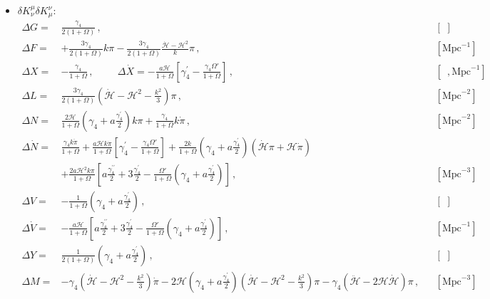\documentclass[prd,nofootinbib,showpacs]{revtex4}
\def\l{\left}
\def\r{\right}
\def\f{\frac}
\def\hub{{\mathcal H}}
\begin{document}
{\begin{itemize}
{\begin{align}
%
& \Delta{ Y}= \f{3}{2(1+\Omega)}\l( \gamma_3+a\f{\gamma_3^\prime}{2}\r) \, , & &  [\,\,] \,\nonumber\\
%
&\Delta{ U}=\f{3}{2}\f{\gamma_3}{1+\Omega} \, . & &  [\,\,] \,
\end{align}}
%
\item[] \underline{$\delta K^\mu_\nu\delta K^\nu_\mu$}:\\
{\small
\begin{align} \label{Eq:ContribGamma4}
%
\Delta{ G} =& \f{\gamma_4}{2(1+\Omega)} \, , & &  [\,\,]  \, \nonumber \\
%
\Delta{ F} =& +\f{3\gamma_4}{2(1+\Omega)}k\pi-\f{3\gamma_4 }{2(1+\Omega)}\f{\dot{\hub}-\hub^2}{k}\pi \, ,& &  [\text{Mpc}^{-1}] \,\nonumber\\
%
\Delta{ X} =& -\f{\gamma_4}{1+\Omega} \,,\hspace{1cm} \Delta\dot{X}=-\f{a\hub}{1+\Omega}\l[\gamma_4^\prime-\f{\gamma_4\Omega'}{1+\Omega} \r] \, , & &  [\,\,\,, \text{Mpc}^{-1}]  \, \nonumber \\
%
\Delta{ L} =& \f{3\gamma_4}{2(1+\Omega)}\l(\dot{\hub}-\hub^2-\f{k^2}{3}\r)\pi \, , & &  [\text{Mpc}^{-2}] \,\nonumber\\
%
\Delta{ N} =& \f{2 \hub}{1+\Omega}\l(\gamma_4+a\f{\gamma_4^\prime}{2} \r)k\pi + \f{\gamma_4}{1+\Omega}k\dot{\pi}\, , & &  [\text{Mpc}^{-2}] \,\nonumber\\
%
\Delta\dot{N} =& \f{\gamma_4k\ddot{\pi}}{1+\Omega} +\f{a\hub k\dot{\pi}}{1+\Omega}\l[\gamma_4^\prime-\f{\gamma_4\Omega'}{1+\Omega} \r] +\f{2k}{1+\Omega}\l(\gamma_4+a\f{\gamma_4^\prime}{2} \r)\l( \dot{\hub}\pi + \hub \dot{\pi} \r) \nonumber\\
& +\f{2a\hub^2k\pi}{1+\Omega}\l[a \f{\gamma_4^{\prime\prime}}{2}+3\f{\gamma_4^\prime}{2}-\f{\Omega'}{1+\Omega}\l(\gamma_4+a\f{\gamma_4^\prime}{2} \r) \r] \, ,& &  [\text{Mpc}^{-3}]  \, \nonumber \\
%
\Delta{ V} =& -\f{1}{1+\Omega}\l(\gamma_4+a\f{\gamma_4^\prime}{2} \r) \, ,& &  [\,\,]  \, \nonumber \\
%
\Delta\dot{V} =& -\f{a\hub}{1+\Omega}\l[a\f{\gamma_4^{\prime\prime}}{2} +3\f{\gamma_4^\prime}{2}-\f{\Omega'}{1+\Omega}\l(\gamma_4+a\f{\gamma_4^\prime}{2} \r) \r] \, , & &  [\text{Mpc}^{-1}]  \, \nonumber \\
%
\Delta{ Y} =& \f{1}{2(1+\Omega)}\l(\gamma_4+a\f{\gamma_4^\prime}{2} \r) \, ,& &  [\,\,]  \ \nonumber \\
%
\Delta{ M} =& -\gamma_4\l(\dot{\hub}-\hub^2-\f{k^2}{3}\r)\dot{\pi} -2\hub\l(\gamma_4+a\f{\gamma_4^\prime}{2} \r)\l(\dot{\hub}-\hub^2-\f{k^2}{3} \r)\pi -\gamma_4\l(\ddot{\hub}-2\hub\dot{\hub}\r)\pi  \, ,& &  [\text{Mpc}^{-3}] \,\nonumber\\

\end{align}}
\end{itemize}}
\end{document}
